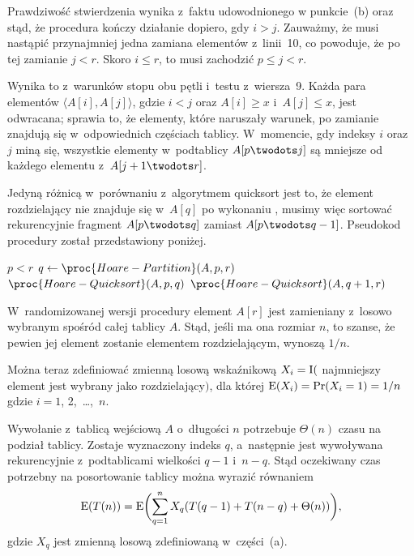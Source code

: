 \subproblem %
Prawdziwość stwierdzenia wynika z~faktu udowodnionego w punkcie~(b) oraz stąd, że procedura kończy działanie dopiero, gdy $i>j$. Zauważmy, że musi nastąpić przynajmniej jedna zamiana elementów z~linii~10, co powoduje, że po tej zamianie $j<r$. Skoro $i\le r$, to musi zachodzić $p\le j<r$.

\subproblem %
Wynika to z~warunków stopu obu pętli  i~testu z~wiersza~9. Każda para elementów $\langle A[i],A[j]\rangle$, gdzie $i<j$ oraz $A[i]\ge x$ i~$A[j]\le x$, jest odwracana; sprawia to, że elementy, które naruszały warunek, po zamianie znajdują się w~odpowiednich częściach tablicy. W~momencie, gdy indeksy $i$ oraz $j$ miną się, wszystkie elementy w~podtablicy $A[p\twodots j]$ są mniejsze od każdego elementu z~$A[j+1\twodots r]$.

\subproblem %
Jedyną różnicą w~porównaniu z~algorytmem quicksort jest to, że element rozdzielający nie znajduje się w~$A[q]$ po wykonaniu , musimy więc sortować rekurencyjnie fragment $A[p\twodots q]$ zamiast $A[p\twodots q-1]$. Pseudokod procedury został przedstawiony poniżej.
\begin{codebox}
\li	\If $p<r$
\li		\Then
			$q\gets\proc{Hoare-Partition}(A,p,r)$
\li			$\proc{Hoare-Quicksort}(A,p,q)$
\li			$\proc{Hoare-Quicksort}(A,q+1,r)$
		\End
\end{codebox}


\subproblem %
W~randomizowanej wersji procedury  element $A[r]$ jest zamieniany z~losowo wybranym spośród całej tablicy $A$. Stąd, jeśli ma ona rozmiar $n$, to szanse, że pewien jej element zostanie elementem rozdzielającym, wynoszą $1/n$.

Można teraz zdefiniować zmienną losową wskaźnikową $X_i=\operatorname{I}($ najmniejszy element jest wybrany jako rozdzielający$)$, dla której $\operatorname{E}(X_i)=\Pr(X_i=1)=1/n$ gdzie $i=1$, 2,~\dots,~$n$.

\subproblem %
Wywołanie  z~tablicą wejściową $A$ o~długości $n$ potrzebuje $\Theta(n)$ czasu na podział tablicy. Zostaje wyznaczony indeks $q$, a~następnie jest wywoływana rekurencyjnie  z~podtablicami wielkości $q-1$ i~$n-q$. Stąd oczekiwany czas potrzebny na posortowanie  tablicy można wyrazić równaniem
\[
	\operatorname{E}(T(n)) = \operatorname{E}\biggl(\sum_{q=1}^nX_q(T(q-1)+T(n-q)+\Theta(n))\biggr),
\]
gdzie $X_q$ jest zmienną losową zdefiniowaną w~części~(a).

